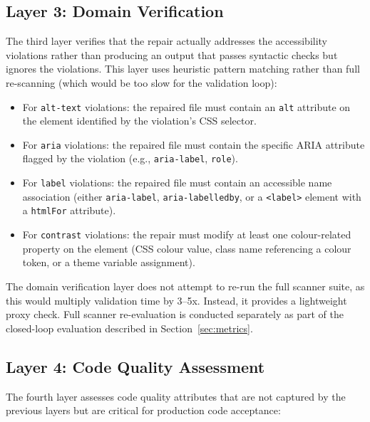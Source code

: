 \subsection{Layer 3: Domain Verification}

The third layer verifies that the repair actually addresses the accessibility
violations rather than producing an output that passes syntactic checks but
ignores the violations.  This layer uses heuristic pattern matching rather
than full re-scanning (which would be too slow for the validation loop):

\begin{itemize}
  \item For \texttt{alt-text} violations: the repaired file must contain an
    \texttt{alt} attribute on the element identified by the violation's CSS
    selector.
  \item For \texttt{aria} violations: the repaired file must contain the
    specific ARIA attribute flagged by the violation (e.g.,
    \texttt{aria-label}, \texttt{role}).
  \item For \texttt{label} violations: the repaired file must contain an
    accessible name association (either \texttt{aria-label},
    \texttt{aria-labelledby}, or a \texttt{<label>} element with a
    \texttt{htmlFor} attribute).
  \item For \texttt{contrast} violations: the repair must modify at least one
    colour-related property on the element (CSS colour value, class name
    referencing a colour token, or a theme variable assignment).
\end{itemize}

The domain verification layer does not attempt to re-run the full scanner
suite, as this would multiply validation time by 3--5x.  Instead, it provides
a lightweight proxy check.  Full scanner re-evaluation is conducted separately
as part of the closed-loop evaluation described in Section~\ref{sec:metrics}.

\subsection{Layer 4: Code Quality Assessment}

The fourth layer assesses code quality attributes that are not captured by
the previous layers but are critical for production code acceptance:

